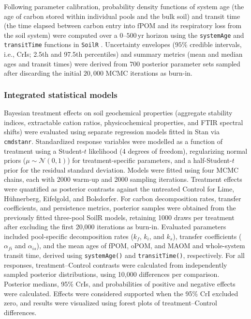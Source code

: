 \documentclass[preprint,12pt]{elsarticle}
\begin{document}
Following parameter calibration, probability density functions of system age (the age of carbon stored within individual pools and the bulk soil) and transit time (the time elapsed between carbon entry into $\text{fPOM}$ and its respiratory loss from the soil system) were computed over a $0\text{--}500\,\text{yr}$ horizon using the \texttt{systemAge} and \texttt{transitTime} functions in \texttt{SoilR} \citep{Sierra2017, Sierra2018}. Uncertainty envelopes ($95\%$ credible intervals, i.e., CrIs; 2.5th and 97.5th percentiles) and summary metrics (mean and median ages and transit times) were derived from $700$ posterior parameter sets sampled after discarding the initial $20{,}000$ MCMC iterations as burn-in.

\subsubsection{Integrated statistical models}
Bayesian treatment effects on soil geochemical properties (aggregate stability indices, extractable cation ratios, physicochemical properties, and FTIR spectral shifts) were evaluated using separate regression models fitted in Stan via \texttt{cmdstanr}. Standardized response variables were modelled as a function of treatment using a Student-$t$ likelihood (4 degrees of freedom), regularizing normal priors ($\mu \sim \mathcal{N}(0,1)$) for treatment-specific parameters, and a half-Student-$t$ prior for the residual standard deviation. Models were fitted using four MCMC chains, each with 2000 warm-up and 2000 sampling iterations. Treatment effects were quantified as posterior contrasts against the untreated Control for Lime, H\"uhnerberg, Eifelgold, and Bolsdorfer. For carbon decomposition rates, transfer coefficients, and persistence metrics, posterior samples were obtained from the previously fitted three-pool SoilR models, retaining 1000 draws per treatment after excluding the first 20,000 iterations as burn-in. Evaluated parameters included pool-specific decomposition rates ($k_f$, $k_i$, and $k_s$), transfer coefficients ($\alpha_{fi}$ and $\alpha_{is}$), and the mean ages of fPOM, oPOM, and MAOM and whole-system transit time, derived using \texttt{systemAge()} and \texttt{transitTime()}, respectively. For all responses, treatment--Control contrasts were calculated from independently sampled posterior distributions, using 10,000 differences per comparison. Posterior medians, 95\% CrIs, and probabilities of positive and negative effects were calculated. Effects were considered supported when the 95\% CrI excluded zero, and results were visualized using forest plots of treatment--Control differences.
\end{document}
